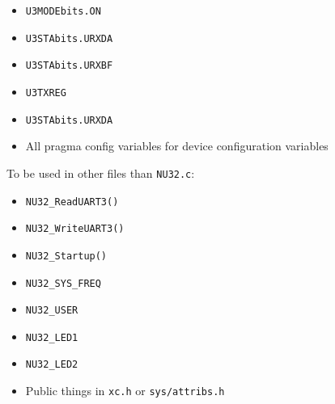 \documentclass[12pt]{article}
\begin{document}
\begin{itemize}
    \item 
    \verb|U3MODEbits.ON|

    \item 
    \verb|U3STAbits.URXDA|

    \item 
    \verb|U3STAbits.URXBF|

    \item 
    \verb|U3TXREG|
    
    \item 
    \verb|U3STAbits.URXDA|

    \item 
    All pragma config variables for device configuration variables

\end{itemize}
To be used in other files than \verb|NU32.c|:
\begin{itemize}
    \item
    \verb|NU32_ReadUART3()|

    \item
    \verb|NU32_WriteUART3()|

    \item
    \verb|NU32_Startup()|

    \item
    \verb|NU32_SYS_FREQ|

    \item
    \verb|NU32_USER|

    \item
    \verb|NU32_LED1|

    \item
    \verb|NU32_LED2|

    \item
    Public things in \verb|xc.h| or \verb|sys/attribs.h|
\end{itemize}
\end{document}
